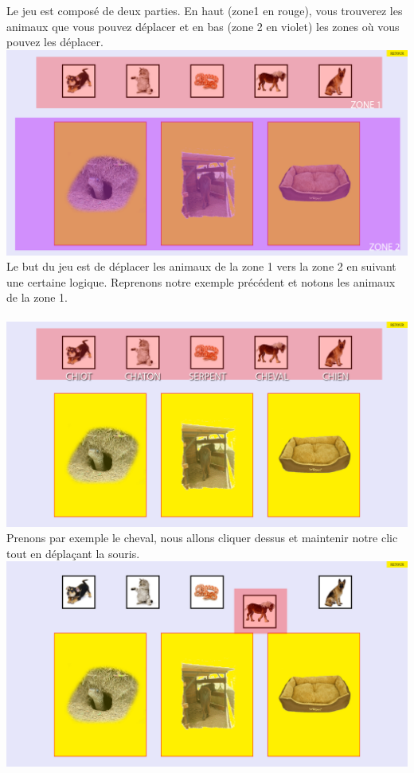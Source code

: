 \documentclass{article}
\begin{document}
Le jeu est compos\'e de deux parties. En haut (zone1 en rouge), vous trouverez les animaux que vous pouvez d\'eplacer et en bas (zone 2 en violet) les zones o\`u vous pouvez les d\'eplacer.
\vspace{0.5cm}\\
\includegraphics[width=1.0\textwidth]{zone}
\vspace{0.5cm}\\
Le but du jeu est de d\'eplacer les animaux de la zone 1 vers la zone 2 en suivant une certaine logique. Reprenons notre exemple pr\'ec\'edent et notons les animaux de la zone 1.\\
\vspace{0.5cm}\\
\includegraphics[width=1.0\textwidth]{zone1}
\vspace{0.5cm}\\
Prenons par exemple le cheval, nous allons cliquer dessus et maintenir notre clic tout en d\'epla\c{c}ant la souris.
\vspace{0.5cm}\\
\includegraphics[width=1.0\textwidth]{zone2}
\end{document}
